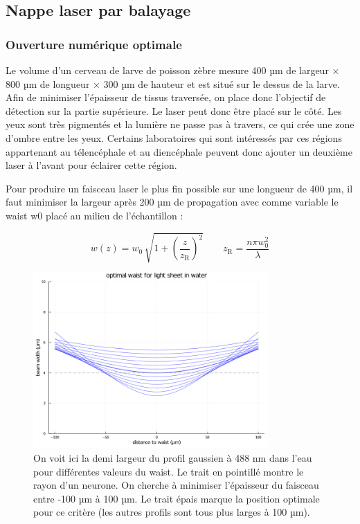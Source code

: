 \subsection{Nappe laser par balayage}

\subsubsection{Ouverture numérique optimale}

Le volume d'un cerveau de larve de poisson zèbre mesure 400 µm de largeur × 800 µm de longueur × 300 µm de hauteur et est situé sur le dessus de la larve. Afin de minimiser l'épaisseur de tissus traversée, on place donc l'objectif de détection sur la partie supérieure. Le laser peut donc être placé sur le côté. Les yeux sont très pigmentés et la lumière ne passe pas à travers, ce qui crée une zone d'ombre entre les yeux. Certains laboratoires qui sont intéressés par ces régions appartenant au télencéphale et au diencéphale peuvent donc ajouter un deuxième laser à l'avant pour éclairer cette région.

Pour produire un faisceau laser le plus fin possible sur une longueur de 400 µm, il faut minimiser la largeur après 200 µm de propagation avec comme variable le waist w0 placé au milieu de l'échantillon :

$$
w(z) = w_0 \, \sqrt{ 1+ {\left( \frac{z}{z_\mathrm{R}} \right)}^2 } \qquad z_\mathrm{R} = \frac{n \pi w_0^2 }{\lambda}
$$

\begin{figure}
\centering
\includegraphics[width=0.8\textwidth]{./files/possible-waist_1P.png}
\caption{On voit ici la demi largeur du profil gaussien à 488 nm dans l'eau pour différentes valeurs du waist. Le trait en pointillé montre le rayon d'un neurone. On cherche à minimiser l'épaisseur du faisceau entre -100 µm à 100 µm. Le trait épais marque la position optimale pour ce critère (les autres profils sont tous plus larges à 100 µm).}
\end{figure}

